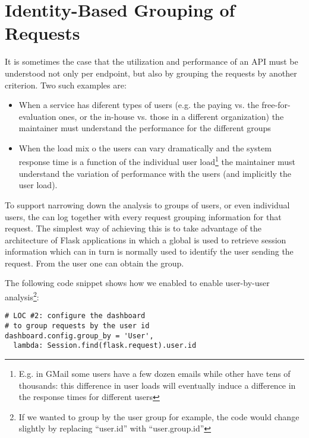 
\section{Identity-Based Grouping of Requests}
\label{sec:grouping}

It is sometimes the case that the utilization and performance of an API must be understood not only per endpoint, but also by grouping the requests by another criterion. Two such examples are: 
\begin{itemize}
	\item When a service has diferent types of users (e.g. the paying vs. the free-for-evaluation ones, or the in-house vs. those in a different organization) the maintainer must understand the performance for the different groups
	\item When the load mix o the users can vary dramatically and the system response time is a function of the individual user load\footnote{E.g. in GMail some users have a few dozen emails while other have tens of thousands: this difference in user loads will eventually induce a difference in the response times for different users} the maintainer must understand the variation of performance with the users (and implicitly the user load).
\end{itemize}

To support narrowing down the analysis to groups of users, or even individual users, the \tool can log together with every request grouping information for that request. The simplest way of achieving this is to take advantage of the architecture of Flask applications in which a global  is used to retrieve session information which can in turn is normally used to identify the user sending the request. From the user one can obtain the group. 

\niceseparator

The following code snippet shows how we enabled \tool to enable user-by-user analysis\footnote{If we wanted to group by the user group for example, the code would change slightly by replacing ``user.id'' with ``user.group.id''}: 

\begin{lstlisting}[style=custompython]  
# LOC #2: configure the dashboard
# to group requests by the user id
dashboard.config.group_by = 'User',
  lambda: Session.find(flask.request).user.id

\end{lstlisting}

